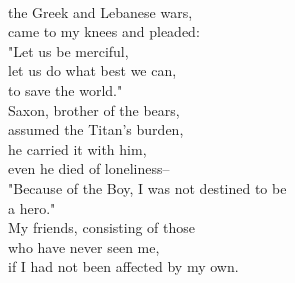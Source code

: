 \documentclass[smalldemyvopaper,11pt,twoside,onecolumn,openright,extrafontsizes]{memoir}
\begin{document}
\\the Greek and Lebanese wars,
\\came to my knees and pleaded:
\\"Let us be merciful,
\\let us do what best we can,
\\to save the world."
\\Saxon, brother of the bears,
\\assumed the Titan's burden,
\\he carried it with him,
\\even he died of loneliness--
\\"Because of the Boy, I was not destined to be
\\a hero."
\\My friends, consisting of those
\\who have never seen me,
\\if I had not been affected by my own.
\end{document}
